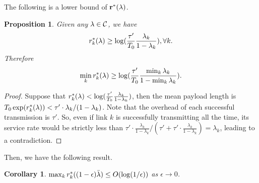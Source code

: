 \documentclass{IEEEtran}
\newtheorem{cor}{Corollary}
\newtheorem{prop}{Proposition}
\begin{document}
The following is a lower bound of ${\bf r}^{*}({\bf \lambda})$.
\begin{prop}
\label{thm:r-lower-bound-2}Given any ${\bf \lambda}\in{\cal C}$,
we have\begin{equation}
r_{k}^{*}({\bf \lambda})\ge\log(\frac{\tau'}{T_{0}}\frac{\lambda_{k}}{1-\lambda_{k}}),\forall k.\label{eq:r-lower-bound-2}\end{equation}
Therefore\begin{equation}
\min_{k}r_{k}^{*}({\bf \lambda})\ge\log(\frac{\tau'}{T_{0}}\frac{\min_{k}\lambda_{k}}{1-\min_{k}\lambda_{k}}).\label{eq:r-lower-bound-3}\end{equation}
\end{prop}
\begin{proof}
Suppose that $r_{k}^{*}({\bf \lambda})<\log(\frac{\tau'}{T_{0}}\frac{\lambda_{k}}{1-\lambda_{k}})$,
then the mean payload length is $T_{0}\exp(r_{k}^{*}({\bf \lambda}))<\tau'\cdot\lambda_{k}/(1-\lambda_{k})$.
Note that the overhead of each successful transmission is $\tau'$.
So, even if link $k$ is successfully transmitting all the time, its
service rate would be strictly less than $\tau'\cdot\frac{\lambda_{k}}{1-\lambda_{k}}/(\tau'+\tau'\cdot\frac{\lambda_{k}}{1-\lambda_{k}})=\lambda_{k}$,
leading to a contradiction. 
\end{proof}
Then, we have the following result.
\begin{cor}
$\max_{k}r_{k}^{*}((1-\epsilon)\bar{{\bf \lambda}})\le O(\log(1/\epsilon))$
as $\epsilon\rightarrow0$.\end{cor}
\end{document}
